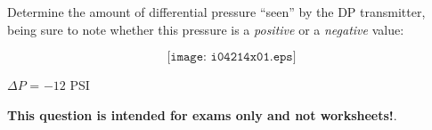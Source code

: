 

Determine the amount of differential pressure ``seen'' by the DP transmitter, being sure to note whether this pressure is a {\it positive} or a {\it negative} value:

$$\texttt{[image: i04214x01.eps]}$$







$\Delta P$ = $-12$ PSI







{\bf This question is intended for exams only and not worksheets!}.




